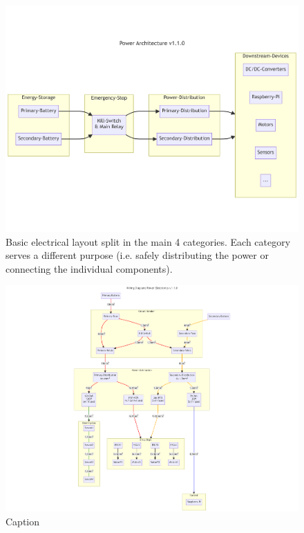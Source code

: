     \begin{figure}[h]
    \includegraphics[width=\textwidth]{contents/figures/power-architecture-v1.1.0.png}
    \caption{Basic electrical layout split in the main 4 categories. Each category serves a different purpose (i.e. safely distributing the power or connecting the individual components).}
    \label{power_architecture}
    \end{figure}
    
    
    \clearpage
    \begin{figure}

        \includegraphics[width=\textwidth]{contents/figures/wiring-diagram-p-v1.1.0.png}
        \caption{Caption}
        \label{wiring_power}
    \end{figure}

